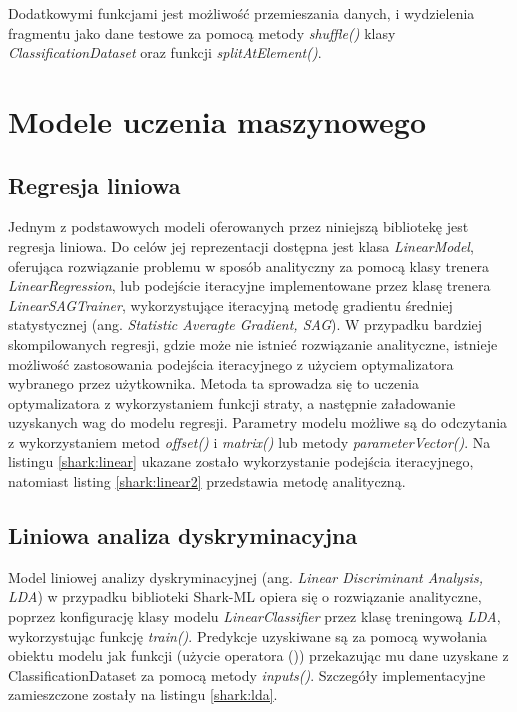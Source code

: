 Dodatkowymi funkcjami jest możliwość przemieszania danych, i wydzielenia fragmentu jako dane testowe za pomocą metody \textit{shuffle()} klasy \textit{ClassificationDataset} oraz funkcji \textit{splitAtElement()}.

\section{Modele uczenia maszynowego}

\subsection{Regresja liniowa}

Jednym z podstawowych modeli oferowanych przez niniejszą bibliotekę jest regresja liniowa. Do celów jej reprezentacji dostępna jest klasa \textit{LinearModel}, oferująca rozwiązanie problemu w sposób analityczny za pomocą klasy trenera \textit{LinearRegression}, lub podejście iteracyjne implementowane przez klasę trenera \textit{LinearSAGTrainer}, wykorzystujące iteracyjną metodę gradientu średniej statystycznej (ang. \textit{Statistic Averagte Gradient, SAG}). W przypadku bardziej skompilowanych regresji, gdzie może nie istnieć rozwiązanie analityczne, istnieje możliwość zastosowania podejścia iteracyjnego z użyciem optymalizatora wybranego przez użytkownika. Metoda ta sprowadza się to uczenia optymalizatora z wykorzystaniem funkcji straty, a następnie załadowanie uzyskanych wag do modelu regresji. Parametry modelu możliwe są do odczytania z wykorzystaniem metod \textit{offset()} i \textit{matrix()} lub metody \textit{parameterVector()}. Na listingu \ref{shark:linear} ukazane zostało wykorzystanie podejścia iteracyjnego, natomiast listing \ref{shark:linear2} przedstawia metodę analityczną.



\subsection{Liniowa analiza dyskryminacyjna}

Model liniowej analizy dyskryminacyjnej (ang. \textit{Linear Discriminant Analysis, LDA}) w przypadku biblioteki Shark-ML opiera się o rozwiązanie analityczne, poprzez konfigurację klasy modelu \textit{LinearClassifier} przez klasę treningową \textit{LDA}, wykorzystując funkcję \textit{train()}. Predykcje uzyskiwane są za pomocą wywołania obiektu modelu jak funkcji (użycie operatora ()) przekazując mu dane uzyskane z ClassificationDataset za pomocą metody \textit{inputs()}. Szczegóły implementacyjne zamieszczone zostały na listingu \ref{shark:lda}.

